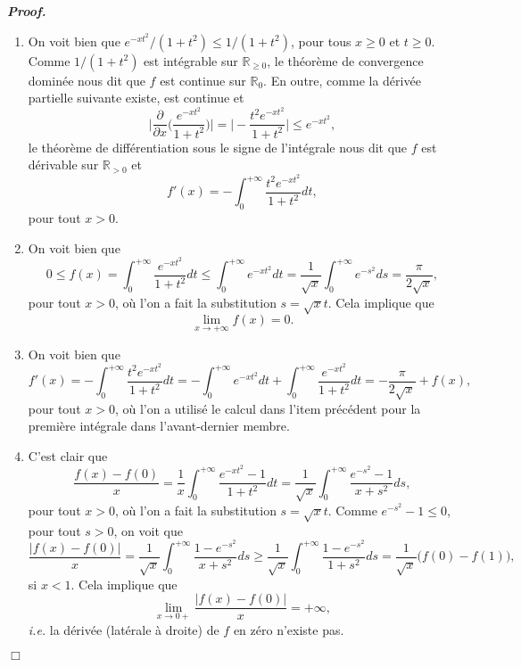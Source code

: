 \documentclass[11pt,a4paper]{article}
\newcommand{\RR}{\mathbb{R}}
\newenvironment{preuve}[1][]
{\vskip 2mm  \noindent\emph{\bf Proof#1. }}{$\Box$ \vskip 2mm}
\let\geq\geqslant
\let\leq\leqslant
\begin{document}
	\begin{preuve}
		\begin{enumerate}
			\item On voit bien que $e^{-xt^{2}}/(1+t^{2}) \leq 1/(1+t^{2})$, pour tous $x \geq 0$ et $t \geq 0$. 
			Comme $1/(1+t^{2})$ est intégrable sur $\RR_{\geq 0}$, le théorème de convergence dominée nous dit que $f$ est continue sur $\RR_{0}$. 
			En outre, comme la dérivée partielle suivante existe, est continue et 
			\[     \bigg| \frac{\partial}{\partial x}\bigg( \frac{e^{-xt^{2}}}{1+t^{2}} \bigg)  \bigg| = \bigg| - \frac{t^{2} e^{-xt^{2}}}{1+t^{2}}   \bigg| \leq e^{-x t^{2}},     \]   
			le théorème de différentiation sous le signe de l'intégrale nous dit que $f$ est dérivable sur $\RR_{>0}$ et 
			\[     f'(x) = -\int_{0}^{+\infty }\frac{t^{2}e^{-xt^{2}}}{1+t^{2}}dt,     \]
			pour tout $x>0$.
			
			\item On voit bien que 
			\[     0 \leq f(x) = \int_{0}^{+\infty }\frac{e^{-xt^{2}}}{1+t^{2}}dt \leq \int_{0}^{+\infty } e^{-xt^{2}} dt = \frac{1}{\sqrt{x}}\int_{0}^{+\infty } e^{-s^{2}} ds = \frac{\pi}{2\sqrt{x}},     \]
			pour tout $x>0$, où l'on a fait la substitution $s = \sqrt{x} t$. 
			Cela implique que 
			\[     \underset{x \rightarrow + \infty} {\lim} f(x) = 0.     \]
			
			\item On voit bien que 
			\[     f'(x) = -\int_{0}^{+\infty }\frac{t^{2}e^{-xt^{2}}}{1+t^{2}}dt = -\int_{0}^{+\infty } e^{-xt^{2}} dt +\int_{0}^{+\infty }\frac{e^{-xt^{2}}}{1+t^{2}}dt = - \frac{\pi}{2\sqrt{x}} + f(x),     \]
			pour tout $x>0$,
			où l'on a utilisé le calcul dans l'item précédent pour la première intégrale dans l'avant-dernier membre. 
			
			\item %
			C'est clair que 
			\[     \frac{f(x) - f(0)}{x} = \frac{1}{x} \int_{0}^{+\infty }\frac{e^{-xt^{2}}-1}{1+t^{2}}dt = \frac{1}{\sqrt{x}} \int_{0}^{+\infty }\frac{e^{-s^{2}}-1}{x+s^{2}}ds,     \]
			pour tout $x>0$, où l'on a fait la substitution $s = \sqrt{x} t$. 
			Comme $e^{-s^{2}}-1 \leq 0$, pour tout $s > 0$, on voit que 
			\[     \frac{|f(x) - f(0)|}{x} = \frac{1}{\sqrt{x}} \int_{0}^{+\infty }\frac{1-e^{-s^{2}}}{x+s^{2}}ds \geq \frac{1}{\sqrt{x}} \int_{0}^{+\infty }\frac{1-e^{-s^{2}}}{1+s^{2}}ds = \frac{1}{\sqrt{x}}\big( f(0) - f(1) \big),     \]
			si $x < 1$. 
			Cela implique que 
			\[     \underset{x \rightarrow 0+} {\lim} \frac{|f(x) - f(0)|}{x} = + \infty,     \]
			\textit{i.e.} la dérivée (latérale à droite) de $f$ en zéro n'existe pas. 
		\end{enumerate}
	\end{preuve}
	
\end{document}
